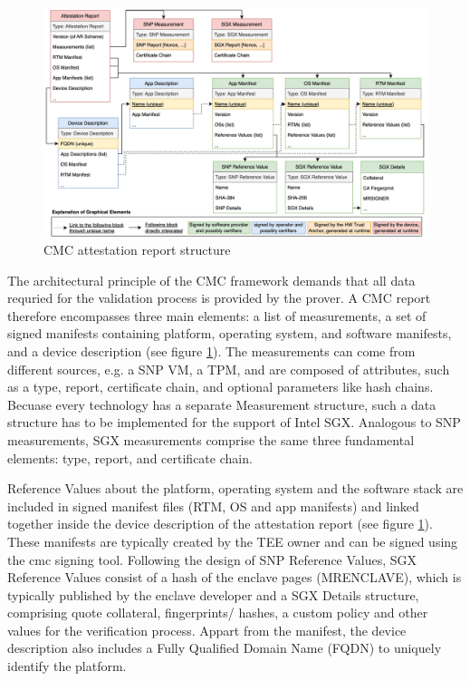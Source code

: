\begin{figure}
	\begin{center} 
		\includegraphics[width=1.0\linewidth]{figures/attestation_report.drawio.png}
	\end{center}
	\caption{CMC attestation report structure \cite{CMC_paper}} 
	\label{attestation-report}
\end{figure}

The architectural principle of the CMC framework demands that all data requried for the validation process is provided by the prover. A CMC report therefore encompasses three main elements: a list of measurements, a set of signed manifests containing platform, operating system, and software manifests, and a device description (see figure \ref{attestation-report}). The measurements can come from different sources, e.g. a SNP VM, a TPM, and are composed of attributes, such as a type, report, certificate chain, and optional parameters like hash chains.
Becuase every technology has a separate Measurement structure, such a data structure has to be implemented for the support of Intel SGX. Analogous to SNP measurements, SGX measurements comprise the same three fundamental elements: type, report, and certificate chain.

Reference Values about the platform, operating system and the software stack are included in signed manifest files (RTM, OS and app manifests) and linked together inside the device description of the attestation report (see figure \ref{attestation-report}). These manifests are typically created by the TEE owner and can be signed using the cmc signing tool. Following the design of SNP Reference Values, SGX Reference Values consist of a hash of the enclave pages (MRENCLAVE), which is typically published by the enclave developer and a SGX Details structure, comprising quote collateral, fingerprints/ hashes, a custom policy and other values for the verification process. Appart from the manifest, the device description also includes a Fully Qualified Domain Name (FQDN) to uniquely identify the platform. 

